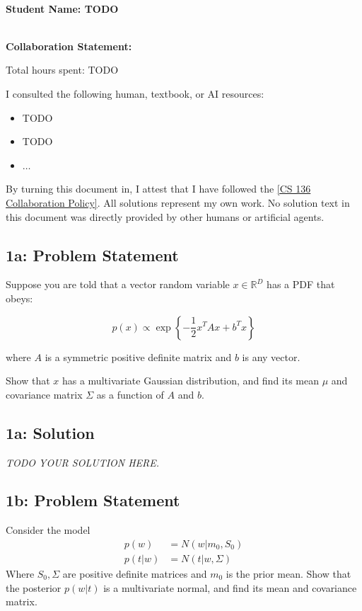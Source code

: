 \documentclass[10pt]{article}
\newcommand{\officialdirections}[1]{{\color{purple} #1}}
\begin{document}
~\\ %

{\Large{\bf Student Name: TODO}}

~\\ %
{\bf Collaboration Statement:}

Total hours spent: TODO

I consulted the following human, textbook, or AI resources:
\begin{itemize}
\item TODO
\item TODO
\item $\ldots$	
\end{itemize}

By turning this document in, I attest that I have followed the 
\href{https://www.cs.tufts.edu/cs/136/2026f/index.html#collaboration}{[CS 136 Collaboration Policy]}. All solutions represent my own work. No solution text in this document was directly provided by other humans or artificial agents. 

\tableofcontents

\newpage
\officialdirections{
\subsection*{1a: Problem Statement}
Suppose you are told that a vector random variable $x \in \mathbb{R}^D$ has a PDF that obeys:

\begin{equation*}
p(x) \propto \exp\left\{-\frac{1}{2} x^T A x + b^T x\right\}
\end{equation*}

where $A$ is a symmetric positive definite matrix and $b$ is any vector.

Show that $x$ has a multivariate Gaussian distribution, and find its mean $\mu$ and covariance matrix $\Sigma$ as a function of $A$ and $b$.
}

\subsection{1a: Solution}

\emph{TODO YOUR SOLUTION HERE.}


\newpage
\officialdirections{
\subsection*{1b: Problem Statement}
Consider the model
\begin{align*}
p(w) &= N(w|m_0,S_0)\\
p(t|w) &= N(t|w,\Sigma)
\end{align*}
Where $S_0,\Sigma$ are positive definite matrices and $m_0$ is the prior mean. Show that the posterior $p(w|t)$ is a multivariate normal, and find its mean and covariance matrix.
}
\end{document}
